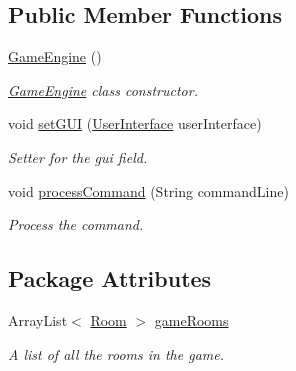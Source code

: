 \subsection*{Public Member Functions}
\begin{DoxyCompactItemize}
\item 
\hyperlink{classGameEngine_a9e8a92f5021a34293060f9aaff4005de}{Game\-Engine} ()
\begin{DoxyCompactList}\small\item\em \hyperlink{classGameEngine}{Game\-Engine} class constructor. \end{DoxyCompactList}\item 
void \hyperlink{classGameEngine_aec901a5b590b3cd204f196165da5dfb6}{set\-G\-U\-I} (\hyperlink{classUserInterface}{User\-Interface} user\-Interface)
\begin{DoxyCompactList}\small\item\em Setter for the gui field. \end{DoxyCompactList}\item 
void \hyperlink{classGameEngine_ad7133885f313fa99bca3bb7cb8272f64}{process\-Command} (String command\-Line)
\begin{DoxyCompactList}\small\item\em Process the command. \end{DoxyCompactList}\end{DoxyCompactItemize}
\subsection*{Package Attributes}
\begin{DoxyCompactItemize}
\item 
Array\-List$<$ \hyperlink{classRoom}{Room} $>$ \hyperlink{classGameEngine_ae5a2f252ec103e0630aebb8635341ea4}{game\-Rooms}
\begin{DoxyCompactList}\small\item\em A list of all the rooms in the game. \end{DoxyCompactList}\end{DoxyCompactItemize}
